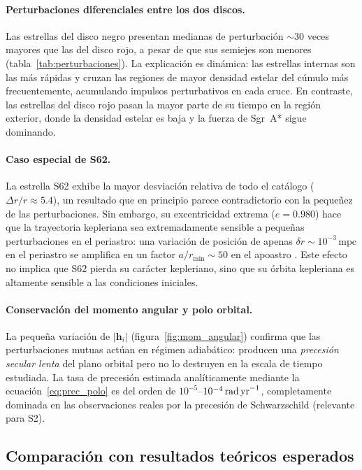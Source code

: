 \documentclass[12pt,a4paper]{article}
\newcommand{\SgrA}{Sgr~A*}
\newcommand{\mpc}{\text{mpc}}
\begin{document}
\paragraph{Perturbaciones diferenciales entre los dos discos.}
Las estrellas del disco negro presentan medianas de perturbación
$\sim 30$ veces mayores que las del disco rojo, a pesar de que sus semiejes
son menores (tabla~\ref{tab:perturbaciones}).  La explicación es dinámica: las
estrellas internas son las más rápidas y cruzan las regiones de mayor densidad
estelar del cúmulo más frecuentemente, acumulando impulsos perturbativos en cada
cruce.  En contraste, las estrellas del disco rojo pasan la mayor parte de su
tiempo en la región exterior, donde la densidad estelar es baja y la fuerza de
\SgrA{} sigue dominando.

\paragraph{Caso especial de S62.}
La estrella S62 exhibe la mayor desviación relativa de todo el catálogo
($\Delta r / r \approx 5.4$), un resultado que en principio parece contradictorio
con la pequeñez de las perturbaciones.  Sin embargo, su excentricidad extrema
($e = 0.980$) hace que la trayectoria kepleriana sea extremadamente sensible a
pequeñas perturbaciones en el periastro: una variación de posición de apenas
$\delta r \sim 10^{-3}\,\mpc$ en el periastro se amplifica en un factor
$a/r_{\min} \sim 50$ en el apoastro \citep{gillessen2017update}.  Este efecto no
implica que S62 pierda su carácter kepleriano, sino que su órbita kepleriana es
altamente sensible a las condiciones iniciales.

\paragraph{Conservación del momento angular y polo orbital.}
La pequeña variación de $|\bm{h}_i|$ (figura~\ref{fig:mom_angular}) confirma que
las perturbaciones mutuas actúan en régimen adiabático: producen una
\emph{precesión secular lenta} del plano orbital pero no lo destruyen en la escala
de tiempo estudiada.  La tasa de precesión estimada analíticamente mediante la
ecuación~\eqref{eq:prec_polo} es del orden de $10^{-5}$--$10^{-4}\,\text{rad\,yr}^{-1}$,
completamente dominada en las observaciones reales por la precesión de Schwarzschild
(relevante para S2).

\subsection{Comparación con resultados teóricos esperados}
\label{subsec:comparacion}
\end{document}

